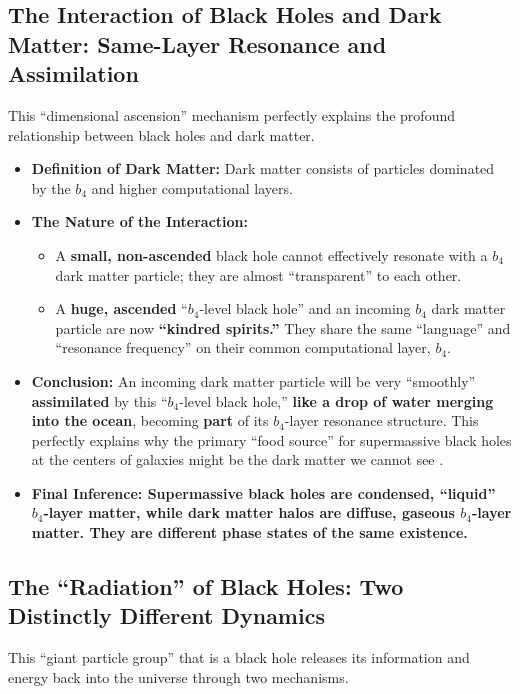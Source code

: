 \documentclass[11pt, a4paper]{article}
\begin{document}
\subsection{The Interaction of Black Holes and Dark Matter: Same-Layer Resonance and Assimilation}

This ``dimensional ascension'' mechanism perfectly explains the profound relationship between black holes and dark matter.

\begin{itemize}
    \item \textbf{Definition of Dark Matter:} Dark matter consists of particles dominated by the $b_4$ and higher computational layers.
    \item \textbf{The Nature of the Interaction:}
    \begin{itemize}
        \item A \textbf{small, non-ascended} black hole cannot effectively resonate with a $b_4$ dark matter particle; they are almost ``transparent'' to each other.
        \item A \textbf{huge, ascended} ``$b_4$-level black hole'' and an incoming $b_4$ dark matter particle are now \textbf{``kindred spirits.''} They share the same ``language'' and ``resonance frequency'' on their common computational layer, $b_4$.
    \end{itemize}
    \item \textbf{Conclusion:} An incoming dark matter particle will be very ``smoothly'' \textbf{assimilated} by this ``$b_4$-level black hole,'' \textbf{like a drop of water merging into the ocean}, becoming \textbf{part} of its $b_4$-layer resonance structure. This perfectly explains why the primary ``food source'' for supermassive black holes at the centers of galaxies might be the dark matter we cannot see \cite{Planck2020}.
    \item \textbf{Final Inference: Supermassive black holes are condensed, ``liquid'' $b_4$-layer matter, while dark matter halos are diffuse, gaseous $b_4$-layer matter. They are different phase states of the same existence.}
\end{itemize}

\subsection{The ``Radiation'' of Black Holes: Two Distinctly Different Dynamics}

This ``giant particle group'' that is a black hole releases its information and energy back into the universe through two mechanisms.
\end{document}
